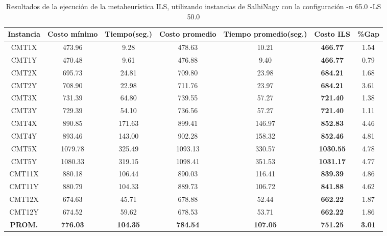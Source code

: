 \begin{table}[ht]
\caption{Resultados de la ejecución de la metaheurística ILS, utilizando instancias de SalhiNagy con la configuración -n 65.0 -LS 50.0}
\centering
\small
\begin{tabular}{c c c c c c c}
\hline\hline
Instancia & Costo mínimo & Tiempo(seg.) & Costo promedio & Tiempo promedio(seg.) & Costo ILS & \%Gap \\ [0.5ex]
\hline
CMT1X & 473.96 & 9.28 & 
478.63 & 10.21 & \bf{466.77} & 
1.54\\CMT1Y & 470.48 & 9.61 & 
476.88 & 9.40 & \bf{466.77} & 
0.79\\CMT2X & 695.73 & 24.81 & 
709.80 & 23.98 & \bf{684.21} & 
1.68\\CMT2Y & 708.90 & 22.98 & 
711.76 & 23.97 & \bf{684.21} & 
3.61\\CMT3X & 731.39 & 64.80 & 
739.55 & 57.27 & \bf{721.40} & 
1.38\\CMT3Y & 729.39 & 54.10 & 
736.56 & 57.27 & \bf{721.40} & 
1.11\\CMT4X & 890.85 & 171.63 & 
899.41 & 146.97 & \bf{852.83} & 
4.46\\CMT4Y & 893.46 & 143.00 & 
902.28 & 158.32 & \bf{852.46} & 
4.81\\CMT5X & 1079.78 & 325.49 & 
1093.13 & 330.57 & \bf{1030.55} & 
4.78\\CMT5Y & 1080.33 & 319.15 & 
1098.41 & 351.53 & \bf{1031.17} & 
4.77\\CMT11X & 880.18 & 106.44 & 
890.03 & 116.41 & \bf{839.39} & 
4.86\\CMT11Y & 880.79 & 104.33 & 
889.73 & 106.72 & \bf{841.88} & 
4.62\\CMT12X & 674.63 & 45.71 & 
678.88 & 52.44 & \bf{662.22} & 
1.87\\CMT12Y & 674.52 & 59.62 & 
678.53 & 53.71 & \bf{662.22} & 
1.86\\\bf{PROM.} & 
\bf{776.03} & \bf{104.35} & \bf{784.54} & \bf{107.05} & \bf{751.25} & \bf{3.01}\\[1ex]\hline
\end{tabular}
\label{table:nonlin}
\end{table} \clearpage
